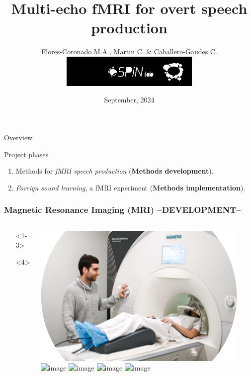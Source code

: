 \documentclass[aspectratio=169]{beamer}
\title[Multi-echo fMRI for overt speech production ]{Multi-echo fMRI for overt speech production }
\date{September, 2024 }
\author{Flores-Coronado M.A., Martin C. \& Caballero-Gaudes C. \vspace{1.4cm}
\includegraphics[width=0.5\textwidth]{images/BCBL_SPiN_copy}}
\begin{document}
\begin{frame}
\maketitle
\end{frame}



\begin{frame}{Overview}
	\begin{center}
		\begin{huge}
		Project phases
		\end{huge}
	\end{center}
	\begin{enumerate}
		\setlength\itemsep{3em}
		\item{Methods for \textit{fMRI speech production} (\textbf{Methods development}).}
		\item{\textit{Foreign sound learning}, a fMRI experiment (\textbf{Methods implementation}).}
	\end{enumerate}
\end{frame}

\begin{frame}
	\frametitle{Magnetic Resonance Imaging (MRI) --DEVELOPMENT--}
\begin{columns}
\begin{tiny}
	\begin{itemize}
		\item[]<1-3>{\color{red}{How does it work?}}
		\item[]<4>{\color{red}{Measument noise sources!}}
	\end{itemize}
\end{tiny}
	\includegraphics[width=.8\textwidth]{images/MRI.png} 
\includegraphics<1>[width=\textwidth]{images/spin0} 
\includegraphics<2>[width=\textwidth]{images/spin1} 
\includegraphics<3>[width=\textwidth]{images/spin2} 
\includegraphics<4>[width=\textwidth]{images/noiseSpeech} 
\end{columns}
\end{frame}
\end{document}
